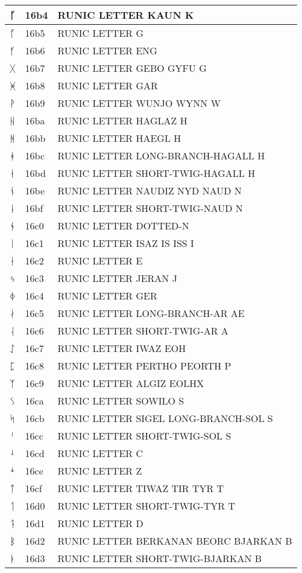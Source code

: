 \documentclass[12pt,letterpaper,openany]{book}
\begin{document}
\begin{center}
\begin{supertabular}{|m{0.25in}|m{0.5in}|m{4in}|}
ᚴ & 16b4 & RUNIC LETTER KAUN K\\\hline
ᚵ & 16b5 & RUNIC LETTER G\\\hline
ᚶ & 16b6 & RUNIC LETTER ENG\\\hline
ᚷ & 16b7 & RUNIC LETTER GEBO GYFU G\\\hline
ᚸ & 16b8 & RUNIC LETTER GAR\\\hline
ᚹ & 16b9 & RUNIC LETTER WUNJO WYNN W\\\hline
ᚺ & 16ba & RUNIC LETTER HAGLAZ H\\\hline
ᚻ & 16bb & RUNIC LETTER HAEGL H\\\hline
ᚼ & 16bc & RUNIC LETTER LONG-BRANCH-HAGALL H\\\hline
ᚽ & 16bd & RUNIC LETTER SHORT-TWIG-HAGALL H\\\hline
ᚾ & 16be & RUNIC LETTER NAUDIZ NYD NAUD N\\\hline
ᚿ & 16bf & RUNIC LETTER SHORT-TWIG-NAUD N\\\hline
ᛀ & 16c0 & RUNIC LETTER DOTTED-N\\\hline
ᛁ & 16c1 & RUNIC LETTER ISAZ IS ISS I\\\hline
ᛂ & 16c2 & RUNIC LETTER E\\\hline
ᛃ & 16c3 & RUNIC LETTER JERAN J\\\hline
ᛄ & 16c4 & RUNIC LETTER GER\\\hline
ᛅ & 16c5 & RUNIC LETTER LONG-BRANCH-AR AE\\\hline
ᛆ & 16c6 & RUNIC LETTER SHORT-TWIG-AR A\\\hline
ᛇ & 16c7 & RUNIC LETTER IWAZ EOH\\\hline
ᛈ & 16c8 & RUNIC LETTER PERTHO PEORTH P\\\hline
ᛉ & 16c9 & RUNIC LETTER ALGIZ EOLHX\\\hline
ᛊ & 16ca & RUNIC LETTER SOWILO S\\\hline
ᛋ & 16cb & RUNIC LETTER SIGEL LONG-BRANCH-SOL S\\\hline
ᛌ & 16cc & RUNIC LETTER SHORT-TWIG-SOL S\\\hline
ᛍ & 16cd & RUNIC LETTER C\\\hline
ᛎ & 16ce & RUNIC LETTER Z\\\hline
ᛏ & 16cf & RUNIC LETTER TIWAZ TIR TYR T\\\hline
ᛐ & 16d0 & RUNIC LETTER SHORT-TWIG-TYR T\\\hline
ᛑ & 16d1 & RUNIC LETTER D\\\hline
ᛒ & 16d2 & RUNIC LETTER BERKANAN BEORC BJARKAN B\\\hline
ᛓ & 16d3 & RUNIC LETTER SHORT-TWIG-BJARKAN B\\\hline

\end{supertabular}
\end{center}
\end{document}
